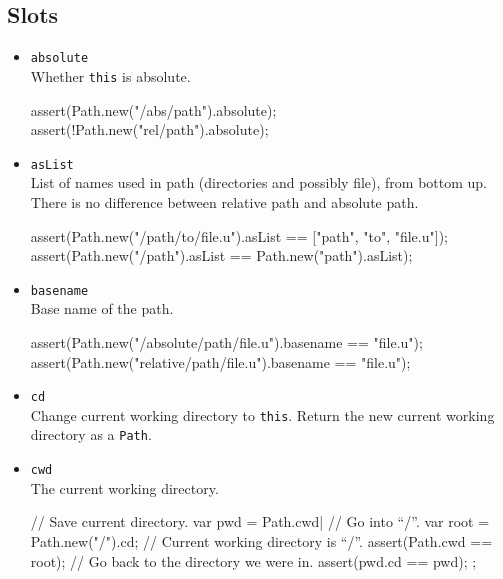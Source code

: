 \subsection{Slots}
\begin{itemize}
\item \lstinline|absolute|\\
  Whether \lstinline|this| is absolute.
\begin{urbiscript}[firstnumber=last]
assert(Path.new("/abs/path").absolute);
assert(!Path.new("rel/path").absolute);
\end{urbiscript}

\item \lstinline|asList|\\
  List of names used in path (directories and possibly file), from
  bottom up. There is no difference between relative path and absolute
  path.
\begin{urbiscript}[firstnumber=last]
assert(Path.new("/path/to/file.u").asList == ["path", "to", "file.u"]);
assert(Path.new("/path").asList           == Path.new("path").asList);
\end{urbiscript}

\item \lstinline|basename|\\
  Base name of the path.
\begin{urbiscript}[firstnumber=last]
assert(Path.new("/absolute/path/file.u").basename == "file.u");
assert(Path.new("relative/path/file.u").basename  == "file.u");
\end{urbiscript}

\item \lstinline|cd|\\
  Change current working directory to \lstinline|this|. Return the new
  current working directory as a \lstinline|Path|.

\item \lstinline|cwd|\\
  The current working directory.
\begin{urbiscript}[firstnumber=last]
{
  // Save current directory.
  var pwd = Path.cwd|
  // Go into ``/''.
  var root = Path.new("/").cd;
  // Current working directory is ``/''.
  assert(Path.cwd == root);
  // Go back to the directory we were in.
  assert(pwd.cd == pwd);
};
\end{urbiscript}


\end{itemize}

